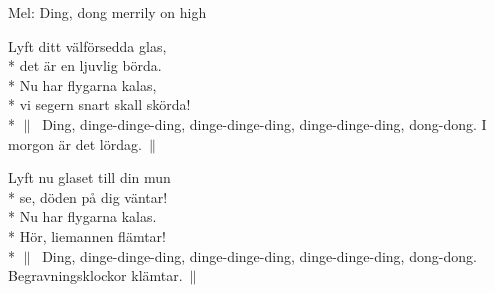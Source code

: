 \begin{SongText}
    \begin{SongInfo}
        Mel: Ding, dong merrily on high
    \end{SongInfo}
    \begin{SongVerse}
        Lyft ditt välförsedda glas,\\*%
        det är en ljuvlig börda.\\*%
        Nu har flygarna kalas,\\*%
        vi segern snart skall skörda!\\*%
        $\|\:$ Ding, dinge-dinge-ding, dinge-dinge-ding, dinge-dinge-ding, dong-dong.
        I morgon är det lördag.$\:\|$
    \end{SongVerse}
    \begin{SongVerse}
        Lyft nu glaset till din mun\\*%
        se, döden på dig väntar!\\*%
        Nu har flygarna kalas.\\*%
        Hör, liemannen flämtar!\\*%
        $\|\:$ Ding, dinge-dinge-ding, dinge-dinge-ding, dinge-dinge-ding, dong-dong.
        Begravningsklockor klämtar.$\:\|$
    \end{SongVerse}
\end{SongText}
